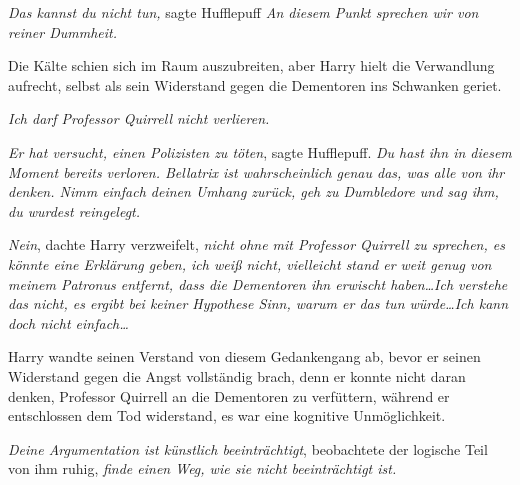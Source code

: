 \emph{Das kannst du nicht tun,} sagte Hufflepuff \emph{An diesem Punkt sprechen wir von reiner Dummheit.}

Die Kälte schien sich im Raum auszubreiten, aber Harry hielt die Verwandlung aufrecht, selbst als sein Widerstand gegen die Dementoren ins Schwanken geriet.

\emph{Ich darf Professor Quirrell nicht verlieren.}

\emph{Er hat versucht, einen Polizisten zu töten}, sagte Hufflepuff. \emph{Du hast ihn in diesem Moment bereits verloren. Bellatrix ist wahrscheinlich genau das, was alle von ihr denken. Nimm einfach deinen Umhang zurück, geh zu Dumbledore und sag ihm, du wurdest reingelegt.}

\emph{Nein}, dachte Harry verzweifelt, \emph{nicht ohne mit Professor Quirrell zu sprechen, es könnte eine Erklärung geben, ich weiß nicht, vielleicht stand er weit genug von meinem Patronus entfernt, dass die Dementoren ihn erwischt haben…Ich verstehe das nicht, es ergibt bei keiner Hypothese Sinn, warum er das tun würde…Ich kann doch nicht einfach…}

Harry wandte seinen Verstand von diesem Gedankengang ab, bevor er seinen Widerstand gegen die Angst vollständig brach, denn er konnte nicht daran denken, Professor Quirrell an die Dementoren zu verfüttern, während er entschlossen dem Tod widerstand, es war eine kognitive Unmöglichkeit.

\emph{Deine Argumentation ist künstlich beeinträchtigt}, beobachtete der logische Teil von ihm ruhig, \emph{finde einen Weg, wie sie nicht beeinträchtigt ist.}

